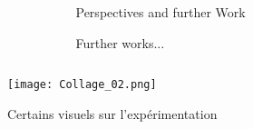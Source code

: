 \documentclass[final]{beamer}
\newlength{\sepwid}
\newlength{\onecolwid}
\newlength{\twocolwid}
\begin{document}
\begin{frame}[t]
\begin{columns}[t]
\begin{column}{\twocolwid}
\begin{columns}[t,totalwidth=\twocolwid]
\begin{column}{\onecolwid}

\end{column} %


\begin{column}{\onecolwid} %



\begin{alertblock}{Perspectives and further Work}

Further works...

\end{alertblock}


\end{column} %

\end{columns} %

\begin{column}{\twocolwid} %


\begin{figure}
\texttt{[image: Collage\_02.png]}
\caption{Certains visuels sur l'expérimentation}
\end{figure}


\end{column} %

\end{column} %


\begin{column}{\sepwid}\end{column} %


\end{columns}
\end{frame}
\end{document}
